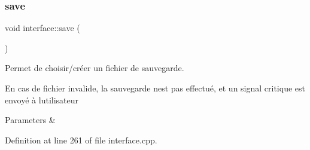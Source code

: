 \subsubsection{\texorpdfstring{save}{save}}
{\footnotesize\ttfamily void interface\+::save (\begin{DoxyParamCaption}{ }\end{DoxyParamCaption})\hspace{0.3cm}{\ttfamily [slot]}}



Permet de choisir/créer un fichier de sauvegarde. 

En cas de fichier invalide, la sauvegarde n\textquotesingle{}est pas effectué, et un signal critique est envoyé à l\textquotesingle{}utilisateur 
\begin{DoxyParams}{Parameters}
{\em } & \\
\hline
\end{DoxyParams}


Definition at line 261 of file interface.\+cpp.

